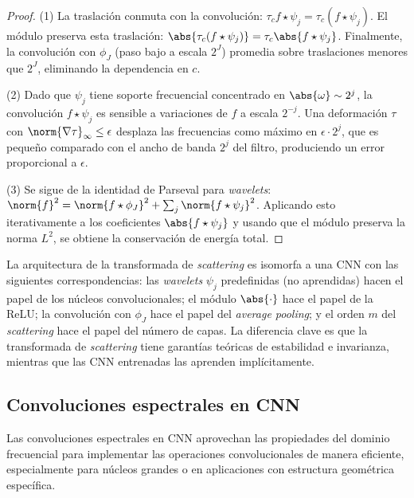 \begin{proof}
(1) La traslaci\'on conmuta con la convoluci\'on:
$\tau_c f \star \psi_j = \tau_c(f \star \psi_j)$. El m\'odulo preserva esta
traslaci\'on: $\abs{\tau_c(f \star \psi_j)} = \tau_c\abs{f \star \psi_j}$.
Finalmente, la convoluci\'on con $\phi_J$ (paso bajo a escala $2^J$) promedia
sobre traslaciones menores que $2^J$, eliminando la dependencia en $c$.

(2) Dado que $\psi_j$ tiene soporte frecuencial concentrado en
$\abs{\omega} \sim 2^j$, la convoluci\'on $f \star \psi_j$ es sensible a
variaciones de $f$ a escala $2^{-j}$. Una deformaci\'on $\tau$ con
$\norm{\nabla \tau}_\infty \leq \epsilon$ desplaza las frecuencias como m\'aximo
en $\epsilon \cdot 2^j$, que es peque\~no comparado con el ancho de banda $2^j$
del filtro, produciendo un error proporcional a $\epsilon$.

(3) Se sigue de la identidad de Parseval para \emph{wavelets}:
$\norm{f}^2 = \norm{f \star \phi_J}^2 + \sum_j \norm{f \star \psi_j}^2$.
Aplicando esto iterativamente a los coeficientes $\abs{f \star \psi_j}$ y usando
que el m\'odulo preserva la norma $L^2$, se obtiene la conservaci\'on de
energ\'ia total.
\end{proof}

\begin{remark}
\label{rem:grids:scattering-cnn}
La arquitectura de la transformada de \emph{scattering} es isomorfa a una CNN
con las siguientes correspondencias: las \emph{wavelets} $\psi_j$ predefinidas
(no aprendidas) hacen el papel de los n\'ucleos convolucionales; el m\'odulo
$\abs{\cdot}$ hace el papel de la ReLU; la convoluci\'on con $\phi_J$ hace el
papel del \emph{average pooling}; y el orden $m$ del \emph{scattering} hace el
papel del n\'umero de capas. La diferencia clave es que la transformada de
\emph{scattering} tiene garant\'ias te\'oricas de estabilidad e invarianza,
mientras que las CNN entrenadas las aprenden impl\'icitamente.
\end{remark}

\subsection{Convoluciones espectrales en CNN}
\label{sec:grids:spectral-cnns}

Las convoluciones espectrales en CNN aprovechan las propiedades del dominio
frecuencial para implementar las operaciones convolucionales de manera
eficiente, especialmente para n\'ucleos grandes o en aplicaciones con estructura
geom\'etrica espec\'ifica.

